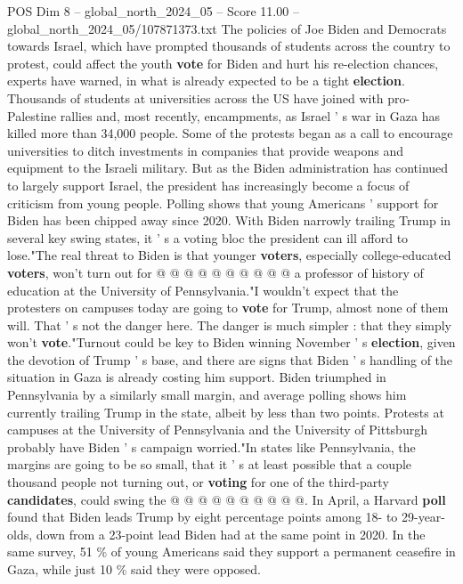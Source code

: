 \begin{textsample}{POS Dim 8 – global\_north\_2024\_05 – Score 11.00 – global\_north\_2024\_05/107871373.txt}  \label{ex:f8_pos_073}
The policies of Joe Biden and Democrats towards Israel, which have prompted thousands of students across the country to protest, could affect the youth \textbf{vote} for Biden and hurt his re-election chances, experts have warned, in what is already expected to be a tight \textbf{election}.
Thousands of students at universities across the US have joined with pro-Palestine rallies and, most recently, encampments, as Israel ' s war in Gaza has killed more than 34,000 people.
Some of the protests began as a call to encourage universities to ditch investments in companies that provide weapons and equipment to the Israeli military.
But as the Biden administration has continued to largely support Israel, the president has increasingly become a focus of criticism from young people.
Polling shows that young Americans ' support for Biden has been chipped away since 2020.
With Biden narrowly trailing Trump in several key swing states, it ' s a voting bloc the president can ill afford to lose."The real threat to Biden is that younger \textbf{voters}, especially college-educated \textbf{voters}, won't turn out for @ @ @ @ @ @ @ @ @ @ a professor of history of education at the University of Pennsylvania."I wouldn't expect that the protesters on campuses today are going to \textbf{vote} for Trump, almost none of them will.
That ' s not the danger here.
The danger is much simpler : that they simply won't \textbf{vote}."Turnout could be key to Biden winning November ' s \textbf{election}, given the devotion of Trump ' s base, and there are signs that Biden ' s handling of the situation in Gaza is already costing him support.
Biden triumphed in Pennsylvania by a similarly small margin, and average polling shows him currently trailing Trump in the state, albeit by less than two points.
Protests at campuses at the University of Pennsylvania and the University of Pittsburgh probably have Biden ' s campaign worried."In states like Pennsylvania, the margins are going to be so small, that it ' s at least possible that a couple thousand people not turning out, or \textbf{voting} for one of the third-party \textbf{candidates}, could swing the @ @ @ @ @ @ @ @ @ @.
In April, a Harvard \textbf{poll} found that Biden leads Trump by eight percentage points among 18- to 29-year-olds, down from a 23-point lead Biden had at the same point in 2020.
In the same survey, 51 \% of young Americans said they support a permanent ceasefire in Gaza, while just 10 \% said they were opposed.

\end{textsample}
